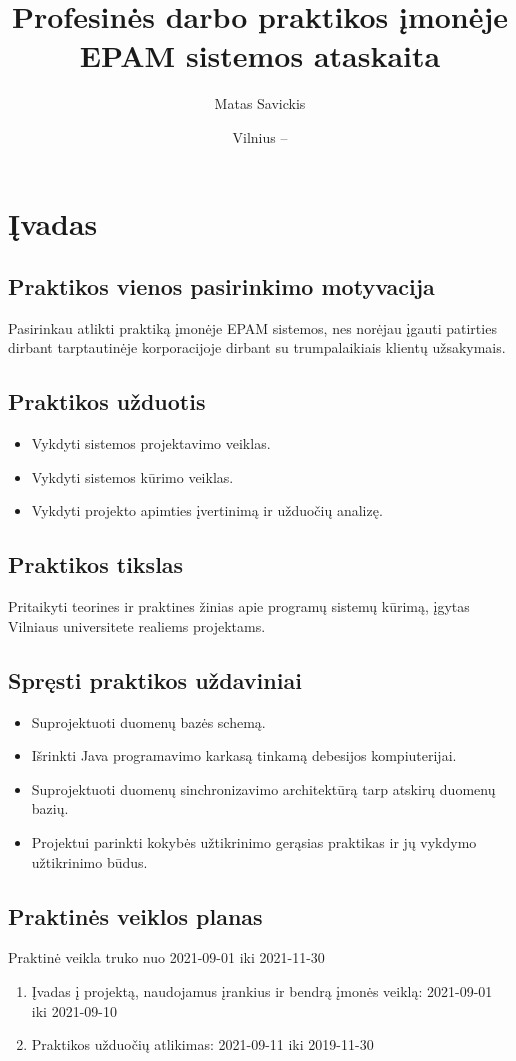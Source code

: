 \documentclass{VUMIFPSkursinis}
\title{Profesinės darbo praktikos įmonėje EPAM sistemos ataskaita}
\author{Matas Savickis}
\date{Vilnius – \the\year}
\begin{document}
\maketitle
\addtocounter{page}{1}
\tableofcontents

\section{Įvadas}
	\subsection{Praktikos vienos pasirinkimo motyvacija}
		Pasirinkau atlikti praktiką įmonėje EPAM sistemos, nes norėjau įgauti patirties dirbant tarptautinėje
		korporacijoje dirbant su trumpalaikiais klientų užsakymais.
	\subsection{Praktikos užduotis}
		\begin{itemize}
			\item{Vykdyti sistemos projektavimo veiklas.}
			\item{Vykdyti sistemos kūrimo veiklas.}
			\item{Vykdyti projekto apimties įvertinimą ir užduočių analizę.}
		\end{itemize}

	\subsection{Praktikos tikslas}
		Pritaikyti teorines ir praktines žinias apie programų sistemų kūrimą, įgytas Vilniaus universitete realiems projektams.

	\subsection{Spręsti praktikos uždaviniai}
		\begin{itemize}
			\item{Suprojektuoti duomenų bazės schemą.}
			\item{Išrinkti Java programavimo karkasą tinkamą debesijos kompiuterijai.}
			\item{Suprojektuoti duomenų sinchronizavimo architektūrą tarp atskirų duomenų bazių.}
			\item{Projektui parinkti kokybės užtikrinimo gerąsias praktikas ir jų vykdymo užtikrinimo būdus.}	
		\end{itemize}
	\subsection{Praktinės veiklos planas}
		Praktinė veikla truko nuo 2021-09-01 iki 2021-11-30
		\begin{enumerate}
			\item{Įvadas į projektą, naudojamus įrankius ir bendrą įmonės veiklą: 2021-09-01 iki 2021-09-10}
			\item{Praktikos užduočių atlikimas: 2021-09-11 iki 2019-11-30}
		\end{enumerate}
\end{document}
